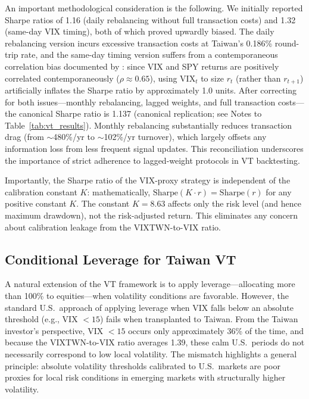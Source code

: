 An important methodological consideration is the following. We initially reported Sharpe ratios of 1.16 (daily rebalancing without full transaction costs) and 1.32 (same-day VIX timing), both of which proved upwardly biased. The daily rebalancing version incurs excessive transaction costs at Taiwan's 0.186\% round-trip rate, and the same-day timing version suffers from a contemporaneous correlation bias documented by \citet{moreira2017}: since VIX and SPY returns are positively correlated contemporaneously ($\rho \approx 0.65$), using $\text{VIX}_t$ to size $r_t$ (rather than $r_{t+1}$) artificially inflates the Sharpe ratio by approximately 1.0 units. After correcting for both issues---monthly rebalancing, lagged weights, and full transaction costs---the canonical Sharpe ratio is 1.137 (canonical replication; see Notes to Table~\ref{tab:vt_results}). Monthly rebalancing substantially reduces transaction drag (from $\sim$480\%/yr to $\sim$102\%/yr turnover), which largely offsets any information loss from less frequent signal updates. This reconciliation underscores the importance of strict adherence to lagged-weight protocols in VT backtesting.

Importantly, the Sharpe ratio of the VIX-proxy strategy is independent of the calibration constant $K$: mathematically, $\text{Sharpe}(K \cdot r) = \text{Sharpe}(r)$ for any positive constant $K$. The constant $K = 8.63$ affects only the risk level (and hence maximum drawdown), not the risk-adjusted return. This eliminates any concern about calibration leakage from the VIXTWN-to-VIX ratio.

\subsection{Conditional Leverage for Taiwan VT}
\label{sec:cond_leverage}

A natural extension of the VT framework is to apply leverage---allocating more than 100\% to equities---when volatility conditions are favorable. However, the standard U.S.\ approach of applying leverage when VIX falls below an absolute threshold (e.g., VIX $< 15$) fails when transplanted to Taiwan. From the Taiwan investor's perspective, VIX $< 15$ occurs only approximately 36\% of the time, and because the VIXTWN-to-VIX ratio averages 1.39, these calm U.S.\ periods do not necessarily correspond to low local volatility. The mismatch highlights a general principle: absolute volatility thresholds calibrated to U.S.\ markets are poor proxies for local risk conditions in emerging markets with structurally higher volatility.

